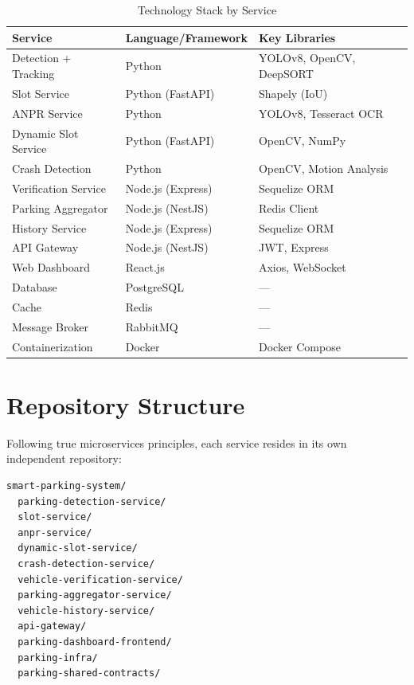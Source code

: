 \documentclass[12pt,a4paper]{report}
\begin{document}
\begin{table}[H]
\centering
\caption{Technology Stack by Service}
\label{tab:tech_stack}
\begin{tabular}{|l|l|l|}
\hline
\textbf{Service} & \textbf{Language/Framework} & \textbf{Key Libraries} \\
\hline
Detection + Tracking & Python & YOLOv8, OpenCV, DeepSORT \\
\hline
Slot Service & Python (FastAPI) & Shapely (IoU) \\
\hline
ANPR Service & Python & YOLOv8, Tesseract OCR \\
\hline
Dynamic Slot Service & Python (FastAPI) & OpenCV, NumPy \\
\hline
Crash Detection & Python & OpenCV, Motion Analysis \\
\hline
Verification Service & Node.js (Express) & Sequelize ORM \\
\hline
Parking Aggregator & Node.js (NestJS) & Redis Client \\
\hline
History Service & Node.js (Express) & Sequelize ORM \\
\hline
API Gateway & Node.js (NestJS) & JWT, Express \\
\hline
Web Dashboard & React.js & Axios, WebSocket \\
\hline
Database & PostgreSQL & --- \\
\hline
Cache & Redis & --- \\
\hline
Message Broker & RabbitMQ & --- \\
\hline
Containerization & Docker & Docker Compose \\
\hline
\end{tabular}
\end{table}

\section{Repository Structure}

Following true microservices principles, each service resides in its own independent repository:

\begin{lstlisting}[language=bash, caption=Repository Layout]
smart-parking-system/
  parking-detection-service/
  slot-service/
  anpr-service/
  dynamic-slot-service/
  crash-detection-service/
  vehicle-verification-service/
  parking-aggregator-service/
  vehicle-history-service/
  api-gateway/
  parking-dashboard-frontend/
  parking-infra/
  parking-shared-contracts/
\end{lstlisting}
\end{document}
